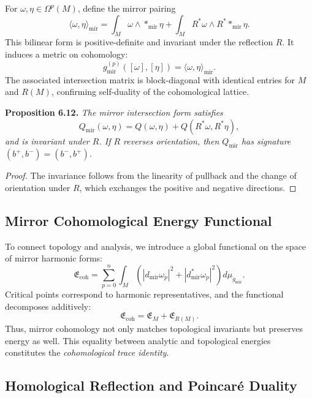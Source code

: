 For \(\omega,\eta\in\Omega^{p}(M)\),
define the mirror pairing
\begin{equation}
\langle \omega,\eta\rangle_{\mathrm{mir}}
=\int_{M}\omega\wedge*_{\mathrm{mir}}\eta
+\int_{M}R^{*}\omega\wedge R^{*}*_{\mathrm{mir}}\eta.
\end{equation}
This bilinear form is positive-definite
and invariant under the reflection \(R\).
It induces a metric on cohomology:
\[
g_{\mathrm{mir}}^{(p)}([\omega],[\eta])
=\langle \omega,\eta\rangle_{\mathrm{mir}}.
\]
The associated intersection matrix is block-diagonal
with identical entries for \(M\) and \(R(M)\),
confirming self-duality of the cohomological lattice.

\noindent
\textbf{Proposition 6.12.}
\emph{The mirror intersection form satisfies}
\[
Q_{\mathrm{mir}}(\omega,\eta)
=Q(\omega,\eta)+Q(R^{*}\omega,R^{*}\eta),
\]
\emph{and is invariant under \(R\).
If \(R\) reverses orientation, then
\(Q_{\mathrm{mir}}\) has signature \((b^{+},b^{-})=(b^{-},b^{+})\).}

\begin{proof}
The invariance follows from the linearity of pullback
and the change of orientation under \(R\),
which exchanges the positive and negative directions.
\end{proof}

\subsection{Mirror Cohomological Energy Functional}\relax \hspace{0pt}

To connect topology and analysis,
we introduce a global functional
on the space of mirror harmonic forms:
\begin{equation}
\mathfrak{E}_{\mathrm{coh}}
=\sum_{p=0}^{n}
\int_{M}
\left(|d_{\mathrm{mir}}\omega_{p}|^{2}
+|d_{\mathrm{mir}}^{*}\omega_{p}|^{2}\right)
d\mu_{g_{\mathrm{mir}}}.
\end{equation}
Critical points correspond to harmonic representatives,
and the functional decomposes additively:
\[
\mathfrak{E}_{\mathrm{coh}}
=\mathfrak{E}_{M}+\mathfrak{E}_{R(M)}.
\]
Thus, mirror cohomology not only matches
topological invariants but preserves energy as well.
This equality between analytic and topological energies
constitutes the \textit{cohomological trace identity}.

\subsection{Homological Reflection and Poincaré Duality}\relax \hspace{0pt}

